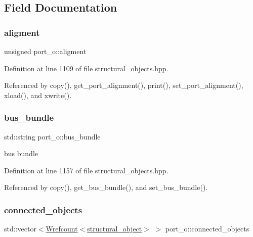\subsection{Field Documentation}
\mbox{\label{structport__o_a92034459d17e4e8b36396d35f877be19}} 
\subsubsection{\texorpdfstring{aligment}{aligment}}
{\footnotesize\ttfamily unsigned port\+\_\+o\+::aligment\hspace{0.3cm}{\ttfamily [private]}}



Definition at line 1109 of file structural\+\_\+objects.\+hpp.



Referenced by copy(), get\+\_\+port\+\_\+alignment(), print(), set\+\_\+port\+\_\+alignment(), xload(), and xwrite().

\mbox{\label{structport__o_ad5ea16ea5d4d94c5376c54f3065d5cbb}} 
\subsubsection{\texorpdfstring{bus\+\_\+bundle}{bus\_bundle}}
{\footnotesize\ttfamily std\+::string port\+\_\+o\+::bus\+\_\+bundle\hspace{0.3cm}{\ttfamily [private]}}



bus bundle 



Definition at line 1157 of file structural\+\_\+objects.\+hpp.



Referenced by copy(), get\+\_\+bus\+\_\+bundle(), and set\+\_\+bus\+\_\+bundle().

\mbox{\label{structport__o_affd660e60f0124cebc4648cd92b34ca1}} 
\subsubsection{\texorpdfstring{connected\+\_\+objects}{connected\_objects}}
{\footnotesize\ttfamily std\+::vector$<$\hyperlink{classWrefcount}{Wrefcount}$<$\hyperlink{classstructural__object}{structural\+\_\+object}$>$ $>$ port\+\_\+o\+::connected\+\_\+objects\hspace{0.3cm}{\ttfamily [private]}}



